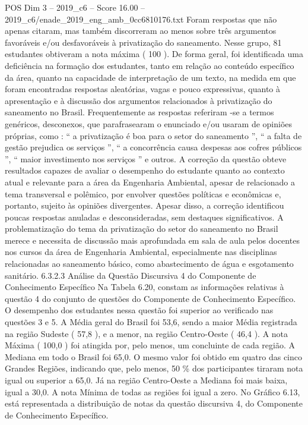 \begin{textsample}{POS Dim 3 – 2019\_c6 – Score 16.00 – 2019\_c6/enade\_2019\_eng\_amb\_0cc6810176.txt}
Foram respostas que não apenas citaram, mas também discorreram ao menos sobre três argumentos favoráveis e/ou desfavoráveis à privatização do saneamento.
Nesse grupo, 81 estudantes obtiveram a nota máxima ( 100 ).
De forma geral, foi identificada uma deficiência na formação dos estudantes, tanto em relação ao conteúdo específico da área, quanto na capacidade de interpretação de um texto, na medida em que foram encontradas respostas aleatórias, vagas e pouco expressivas, quanto à apresentação e à discussão dos argumentos relacionados à privatização do saneamento no Brasil.
Frequentemente as respostas referiram -se a termos genéricos, desconexos, que parafrasearam o enunciado e/ou usaram de opiniões próprias, como : “ a privatização é boa para o setor do saneamento ”, “ a falta de gestão prejudica os serviços ”, “ a concorrência causa despesas aos cofres públicos ”, “ maior investimento nos serviços ” e outros.
A correção da questão obteve resultados capazes de avaliar o desempenho do estudante quanto ao contexto atual e relevante para a área da Engenharia Ambiental, apesar de relacionado a tema transversal e polêmico, por envolver questões políticas e econômicas e, portanto, sujeito às opiniões divergentes.
Apesar disso, a correção identificou poucas respostas anuladas e desconsideradas, sem destaques significativos.
A problematização do tema da privatização do setor do saneamento no Brasil merece e necessita de discussão mais aprofundada em sala de aula pelos docentes nos cursos da área de Engenharia Ambiental, especialmente nas disciplinas relacionadas ao saneamento básico, como abastecimento de água e esgotamento sanitário. 6.3.2.3 Análise da Questão Discursiva 4 do Componente de Conhecimento Específico Na Tabela 6.20, constam as informações relativas à questão 4 do conjunto de questões do Componente de Conhecimento Específico.
O desempenho dos estudantes nessa questão foi superior ao verificado nas questões 3 e 5.
A Média geral do Brasil foi 53,6, sendo a maior Média registrada na região Sudeste ( 57,8 ), e a menor, na região Centro-Oeste ( 46,4 ).
A nota Máxima ( 100,0 ) foi atingida por, pelo menos, um concluinte de cada região.
A Mediana em todo o Brasil foi 65,0.
O mesmo valor foi obtido em quatro das cinco Grandes Regiões, indicando que, pelo menos, 50 \% dos participantes tiraram nota igual ou superior a 65,0.
Já na região Centro-Oeste a Mediana foi mais baixa, igual a 30,0.
A nota Mínima de todas as regiões foi igual a zero.
No Gráfico 6.13, está representada a distribuição de notas da questão discursiva 4, do Componente de Conhecimento Específico.

\end{textsample}
